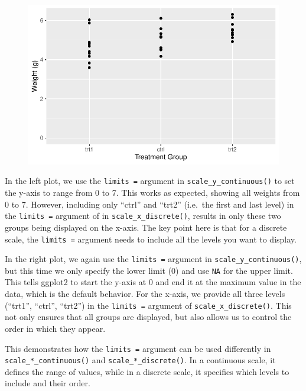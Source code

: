 \documentclass[
  letterpaper,
  DIV=11,
  numbers=noendperiod]{scrartcl}
\begin{document}
\begin{figure}[H]

{\centering \includegraphics{ggplot2intro_files/figure-pdf/unnamed-chunk-9-1.pdf}

}

\end{figure}

In the left plot, we use the \texttt{limits\ =} argument in
\texttt{scale\_y\_continuous()} to set the y-axis to range from 0 to 7.
This works as expected, showing all weights from 0 to 7. However,
including only ``ctrl'' and ``trt2'' (i.e.~the first and last level) in
the \texttt{limits\ =} argument of in \texttt{scale\_x\_discrete()},
results in only these two groups being displayed on the x-axis. The key
point here is that for a discrete scale, the \texttt{limits\ =} argument
needs to include all the levels you want to display.

In the right plot, we again use the \texttt{limits\ =} argument in
\texttt{scale\_y\_continuous()}, but this time we only specify the lower
limit (0) and use \texttt{NA} for the upper limit. This tells ggplot2 to
start the y-axis at 0 and end it at the maximum value in the data, which
is the default behavior. For the x-axis, we provide all three levels
(``trt1'', ``ctrl'', ``trt2'') in the \texttt{limits\ =} argument of
\texttt{scale\_x\_discrete()}. This not only ensures that all groups are
displayed, but also allows us to control the order in which they appear.

This demonstrates how the \texttt{limits\ =} argument can be used
differently in \texttt{scale\_*\_continuous()} and
\texttt{scale\_*\_discrete()}. In a continuous scale, it defines the
range of values, while in a discrete scale, it specifies which levels to
include and their order.
\end{document}
